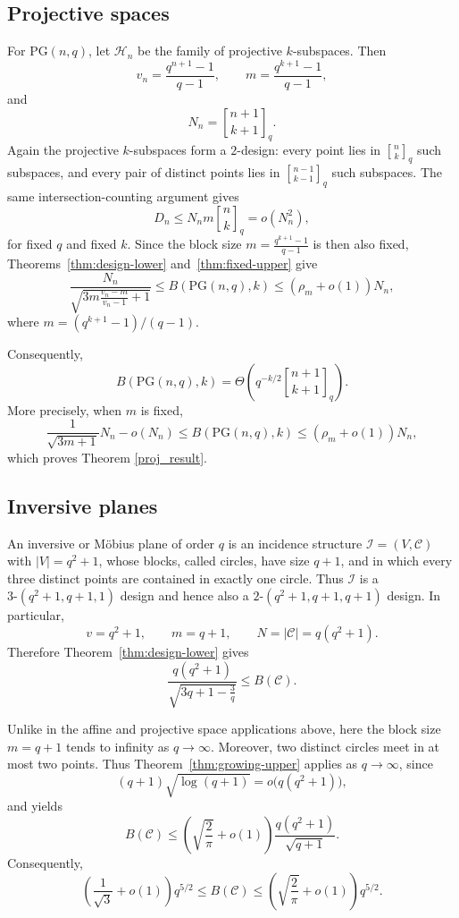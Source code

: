 \documentclass[10pt]{article}
\newcommand{\PG}{\mathrm{PG}}
\theoremstyle{definition}
\begin{document}
	\subsection{Projective spaces} For $\PG(n,q)$, let \(\mathcal H_n\) be the family of projective
	\(k\)-subspaces.  Then
	\[
	v_n=\frac{q^{n+1}-1}{q-1},
	\qquad
	m=\frac{q^{k+1}-1}{q-1},
	\]
	and
	\[
	N_n={n+1\brack k+1}_q.
	\]
	Again the projective \(k\)-subspaces form a \(2\)-design: every point
	lies in \({n\brack k}_q\) such subspaces, and every pair of distinct
	points lies in \({n-1\brack k-1}_q\) such subspaces.  The same
	intersection-counting argument gives
	\[
	D_n
	\leq
	N_n m{n\brack k}_q
	=
	o(N_n^2),
	\]
	for fixed \(q\) and fixed \(k\). Since the block size
	\(
	m=\frac{q^{k+1}-1}{q-1}
	\)
	is then also fixed,
	Theorems~\ref{thm:design-lower} and~\ref{thm:fixed-upper} give
	\[
	\frac{N_n}
	{\sqrt{3m\frac{v_n-m}{v_n-1}+1}}
	\leq
	B(\PG(n,q),k)
	\leq
	\left(\rho_m+o(1)\right)N_n,
	\]
	where \(m=(q^{k+1}-1)/(q-1)\).
	
	
	Consequently, 
	\[
	B(\PG(n,q),k)=\Theta(q^{-k/2} {n+1\brack k+1}_q).
	\]
	More precisely, when \(m\) is fixed,
	\[
	\frac{1}{\sqrt{3m+1}}N_n-o(N_n)
	\leq
	B(\PG(n,q),k)
	\leq
	\left(\rho_m+o(1)\right)N_n,
	\] which proves Theorem \ref{proj_result}.
	
	\subsection{Inversive planes}
	
	An inversive or Möbius plane of order \(q\) is an incidence structure
	\(\mathcal I=(V,\mathcal C)\) with \(|V|=q^2+1\), whose blocks, called
	circles, have size \(q+1\), and in which every three distinct points are
	contained in exactly one circle. Thus \(\mathcal I\) is a
	\(3\text{-}(q^2+1,q+1,1)\) design and hence also a
	\(2\text{-}(q^2+1,q+1,q+1)\) design. In particular,
	\[
	v=q^2+1,\qquad m=q+1,\qquad N=|\mathcal C|=q(q^2+1).
	\]
	Therefore Theorem~\ref{thm:design-lower} gives
	\[
	\frac{q(q^2+1)}{\sqrt{3q+1-\frac{3}{q}}} \leq B(\mathcal C).
	\]
	
	Unlike in the affine and projective space applications above, here the
	block size \(m=q+1\) tends to infinity as \(q\to\infty\).
	Moreover, two distinct circles meet in at most two points. Thus
	Theorem~\ref{thm:growing-upper} applies as \(q\to\infty\), since
	\[
	(q+1)\sqrt{\log(q+1)}=o\bigl(q(q^2+1)\bigr),
	\]
	and yields
	\[
	B(\mathcal C)\leq
	\left(\sqrt{\frac{2}{\pi}}+o(1)\right)
	\frac{q(q^2+1)}{\sqrt{q+1}}.
	\]
	Consequently,
	\[
	\left(\frac{1}{\sqrt3}+o(1)\right)q^{5/2}
	\leq B(\mathcal C)\leq
	\left(\sqrt{\frac{2}{\pi}}+o(1)\right)q^{5/2}.
	\]
	
\end{document}
